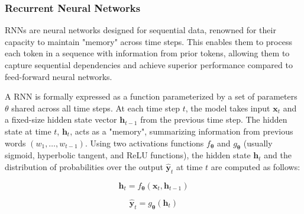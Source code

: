 
\subsubsection{Recurrent Neural Networks}

\acp{RNN} are neural networks designed for sequential data, renowned for their capacity to maintain "memory" across time steps. This enables them to process each token in a sequence with information from prior tokens, allowing them to capture sequential dependencies and achieve superior performance compared to feed-forward neural networks.

\noindent A \ac{RNN} is formally expressed as a function parameterized by a set of parameters $\theta$ shared across all time steps. At each time step $t$, the model takes input $\bm{x}_t$ and a fixed-size hidden state vector $\bm{h}_{t-1}$ from the previous time step. The hidden state at time $t$, $\bm{h}_t$, acts as a "memory", summarizing information from previous words $(w_1, \ldots, w_{t-1})$. Using two activations functions $f_{\bm{\theta}}$ and $g_{\bm{\theta}}$ (usually sigmoid, hyperbolic tangent, and \ac{ReLU} functions), the hidden state $\bm{h}_t$ and the distribution of probabilities over the output $\hat{\bm{y}}_t$ at time $t$ are computed as follows:

\begin{equation}
    \bm{h}_{t} = f_{\bm{\theta}}(\bm{x}_t, \bm{h}_{t-1})
\end{equation}

\begin{equation}
    \hat{\bm{y}}_t = g_{\bm{\theta}}(\bm{h}_t)
\end{equation}


